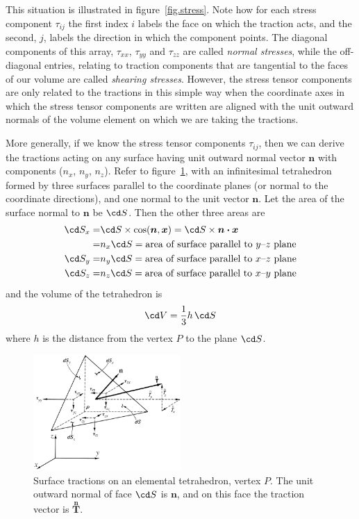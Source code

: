 \documentclass[a4paper,11pt]		{report}
\begin{document}
This situation is illustrated in figure~\ref{fig.stress}. Note how for
each stress component $\tau_{ij}$ the first index $i$ labels the face
on which the traction acts, and the second, $j$, labels the direction
in which the component points. The diagonal components of this array,
$\tau_{xx}$, $\tau_{yy}$ and $\tau_{zz}$ are called \emph{normal
stresses}, while the off-diagonal entries, relating to traction
components that are tangential to the faces of our volume are called
\emph{shearing stresses}. However, the stress tensor components are
only related to the tractions in this simple way when the coordinate
axes in which the stress tensor components are written are aligned
with the unit outward normals of the volume element on which we are
taking the tractions.

More generally, if we know the stress tensor components $\tau_{ij}$,
then we can derive the tractions acting on any surface having unit
outward normal vector $\bm{n}$ with components ($n_x$, $n_y$,
$n_z$). Refer to figure~\ref{fig.tetra}, with an infinitesimal
tetrahedron formed by three surfaces parallel to the coordinate planes
(or normal to the coordinate directions), and one normal to the unit
vector $\bm{n}$. Let the area of the surface normal to $\bm{n}$ be
$\cd S$.  Then the other three areas are
\begin{align*}
\cd S_x = & \cd S\times\cos(\bm{n},\bm{x}) = \cd S\times\bm{n\cdot x}\\
        = & n_x\cd S = \textrm{area of surface parallel to $y$--$z$ plane}\\
\cd S_y = & n_y\cd S = \textrm{area of surface parallel to $x$--$z$ plane}\\
\cd S_z = & n_z\cd S = \textrm{area of surface parallel to $x$--$y$ plane}\\
\end{align*}
and the volume of the tetrahedron is
\[
\cd V=\frac{1}{3} h\, \cd S
\]
where $h$ is the distance from the vertex $P$ to the plane $\cd S$.

\begin{figure}
\begin{center}
\includegraphics[width=0.5\textwidth]{Fung-3.7.eps}
\end{center}
\caption{Surface tractions on an elemental tetrahedron, vertex
  $P$. The unit outward normal of face $\cd S$ is $\bm{n}$, and on
  this face the traction vector is $\stackrel{\bm{n}}{\bm{T}}$.}
\label{fig.tetra}
\end{figure}
\end{document}
